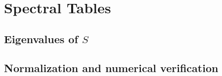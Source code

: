 \chapter{Spectral Tables}
\section{Eigenvalues of $S$}

\section{Normalization and numerical verification}

